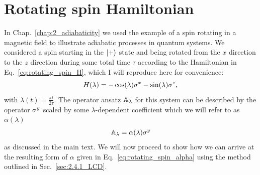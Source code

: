 \appendix

\chapter{Rotating spin Hamiltonian}\label{app:rotating_spin_hamiltonian}

In Chap.~\ref{chap:2_adiabaticity} we used the example of a spin rotating in a magnetic field to illustrate adiabatic processes in quantum systems. We considered a spin starting in the $\ket{+}$ state and being rotated from the $x$ direction to the $z$ direction during some total time $\tau$ according to the Hamiltonian in Eq.~\eqref{eq:rotating_spin_H}, which I will reproduce here for convenience:
\begin{equation}\label{eq:rotating_spin_H_lambda}
    H(\lambda) = -\cos(\lambda)\sigma^x - \sin(\lambda)\sigma^z,
\end{equation}
with $\lambda(t) = \frac{\pi t}{2 \tau}$. The  operator ansatz $\mathbb{A}_{\lambda}$ for this system can be described by the operator $\sigma^y$ scaled by some $\lambda$-dependent coefficient which we will refer to as $\alpha(\lambda)$
\begin{equation}
    \mathbb{A}_{\lambda} = \alpha(\lambda) \sigma^y
\end{equation}
as discussed in the main text. We will now proceed to show how we can arrive at the resulting form of $\alpha$ given in Eq.~\eqref{eq:rotating_spin_alpha} using the  method outlined in Sec.~\ref{sec:2.4.1_LCD}.

